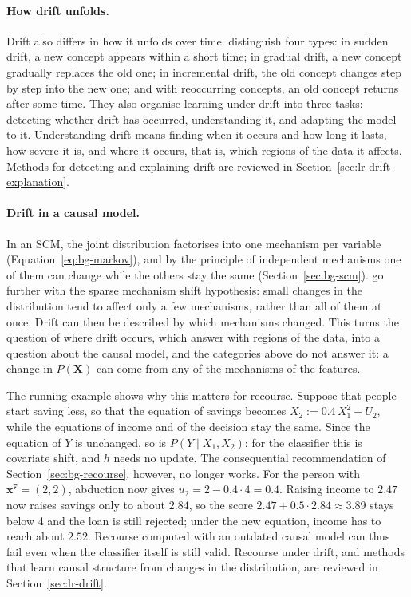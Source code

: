 \paragraph{How drift unfolds.}
Drift also differs in how it unfolds over time. \citet{lu2018learning} distinguish four types: in
sudden drift, a new concept appears within a short time; in gradual drift, a new concept gradually
replaces the old one; in incremental drift, the old concept changes step by step into the new one;
and with reoccurring concepts, an old concept returns after some time. They also organise learning
under drift into three tasks: detecting whether drift has occurred, understanding it, and adapting
the model to it. Understanding drift means finding when it occurs and how long it lasts, how severe
it is, and where it occurs, that is, which regions of the data it affects. Methods for detecting
and explaining drift are reviewed in Section~\ref{sec:lr-drift-explanation}.

\paragraph{Drift in a causal model.}
In an SCM, the joint distribution factorises into one mechanism per variable
(Equation~\ref{eq:bg-markov}), and by the principle of independent mechanisms one of them can
change while the others stay the same (Section~\ref{sec:bg-scm}). \citet{scholkopf2021toward} go
further with the sparse mechanism shift hypothesis: small changes in the distribution tend to affect
only a few mechanisms, rather than all of them at once. Drift can then be described by which
mechanisms changed. This turns the question of where drift occurs, which \citet{lu2018learning}
answer with regions of the data, into a question about the causal model, and the categories above
do not answer it: a change in $P(\mathbf{X})$ can come from any of the mechanisms of the features.

The running example shows why this matters for recourse. Suppose that people start saving less, so
that the equation of savings becomes $X_2 := 0.4\,X_1^2 + U_2$, while the equations of income and of
the decision stay the same. Since the equation of $Y$ is unchanged, so is
$P(Y \mid X_1, X_2)$: for the classifier this is covariate shift, and $h$ needs no update. The
consequential recommendation of Section~\ref{sec:bg-recourse}, however, no longer works. For the
person with $\mathbf{x}^{\mathtt{F}} = (2, 2)$, abduction now gives $u_2 = 2 - 0.4 \cdot 4 = 0.4$.
Raising income to $2.47$ now raises savings only to about $2.84$, so the score
$2.47 + 0.5 \cdot 2.84 \approx 3.89$ stays below 4 and the loan is still rejected; under the new
equation, income has to reach about $2.52$. Recourse computed with an outdated causal model can thus
fail even when the classifier itself is still valid. Recourse under drift, and methods that learn
causal structure from changes in the distribution, are reviewed in Section~\ref{sec:lr-drift}.

